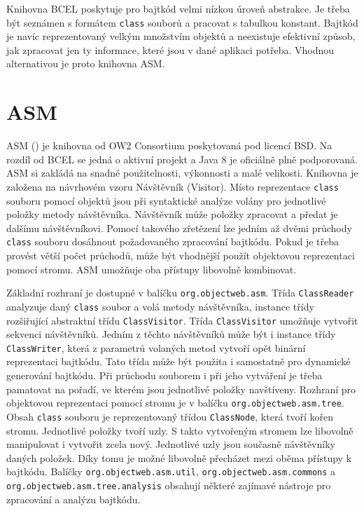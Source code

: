 
Knihovna BCEL poskytuje pro bajtkód velmi nízkou úroveň abstrakce. Je třeba být seznámen s formátem \texttt{class} souborů a pracovat s tabulkou konstant. Bajtkód je navíc reprezentovaný velkým množstvím objektů a neexistuje efektivní způsob, jak zpracovat jen ty informace, které jsou v dané aplikaci potřeba. Vhodnou alternativou je proto knihovna ASM.




\section{ASM}\label{ToolsASM}

ASM () je knihovna od OW2 Consortium poskytovaná pod licencí BSD. Na rozdíl od BCEL se jedná o aktivní projekt a Java 8 je oficiálně plně podporovaná. ASM si zakládá na snadné použitelnosti, výkonnosti a malé velikosti. 
Knihovna je založena na návrhovém vzoru Návštěvník (Visitor). Místo reprezentace \texttt{class} souboru pomocí objektů jsou při syntaktické analýze volány pro jednotlivé položky metody návštěvníka. Návštěvník může položky zpracovat a předat je dalšímu návštěvníkovi. Pomocí takového zřetězení lze jedním až dvěmi průchody \texttt{class} souboru dosáhnout požadovaného zpracování bajtkódu. Pokud je třeba provést větší počet průchodů, může být vhodnější použít objektovou reprezentaci pomocí stromu. ASM umožňuje oba přístupy libovolně kombinovat.

Základní rozhraní je dostupné v balíčku \texttt{org.objectweb.asm}. Třída \texttt{ClassReader} analyzuje daný \texttt{class} soubor a volá metody návštěvníka, instance třídy rozšiřující abstraktní třídu \texttt{ClassVisitor}. Třída \texttt{ClassVisitor} umožňuje vytvořit sekvenci návštěvníků. Jedním z těchto návštěvníků může být i instance třídy \texttt{ClassWriter}, která z parametrů volaných metod vytvoří opět binární reprezentaci bajtkódu. Tato třída může být použita i samostatně pro dynamické generování bajtkódu. Při průchodu souborem i při jeho vytváření je třeba pamatovat na pořadí, ve kterém jsou jednotlivé položky navštíveny.
Rozhraní pro objektovou reprezentaci pomocí stromu je v balíčku \texttt{org.objectweb.asm.tree}. Obsah \texttt{class} souboru je reprezentovaný třídou \texttt{ClassNode}, která tvoří kořen stromu. Jednotlivé položky tvoří uzly. S takto vytvořeným stromem lze libovolně manipulovat i vytvořit zcela nový. Jednotlivé uzly jsou současně návštěvníky daných položek. Díky tomu je možné libovolně přecházet mezi oběma přístupy k bajtkódu.
Balíčky \texttt{org.objectweb.asm.util}, \texttt{org.objectweb.asm.commons} a \texttt{org.objectweb.asm.tree.analysis} obsahují některé zajímavé nástroje pro zpracování a analýzu bajtkódu.

